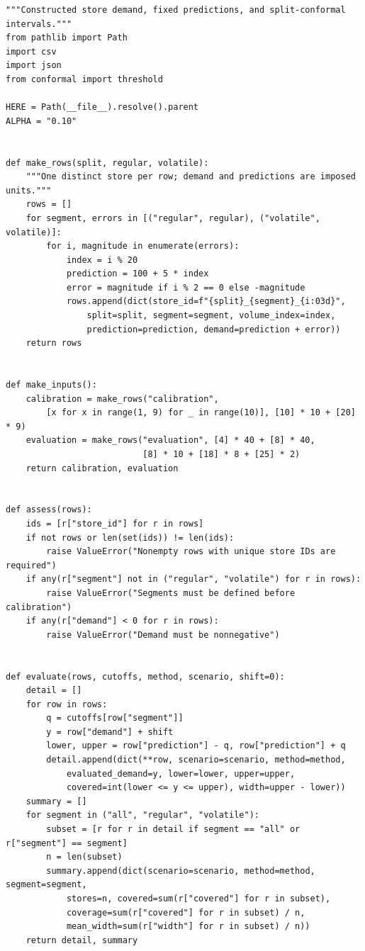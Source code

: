 \begin{Verbatim}[breaklines,breakanywhere,fontsize=\small]
"""Constructed store demand, fixed predictions, and split-conformal intervals."""
from pathlib import Path
import csv
import json
from conformal import threshold

HERE = Path(__file__).resolve().parent
ALPHA = "0.10"


def make_rows(split, regular, volatile):
    """One distinct store per row; demand and predictions are imposed units."""
    rows = []
    for segment, errors in [("regular", regular), ("volatile", volatile)]:
        for i, magnitude in enumerate(errors):
            index = i % 20
            prediction = 100 + 5 * index
            error = magnitude if i % 2 == 0 else -magnitude
            rows.append(dict(store_id=f"{split}_{segment}_{i:03d}",
                split=split, segment=segment, volume_index=index,
                prediction=prediction, demand=prediction + error))
    return rows


def make_inputs():
    calibration = make_rows("calibration",
        [x for x in range(1, 9) for _ in range(10)], [10] * 10 + [20] * 9)
    evaluation = make_rows("evaluation", [4] * 40 + [8] * 40,
                           [8] * 10 + [18] * 8 + [25] * 2)
    return calibration, evaluation


def assess(rows):
    ids = [r["store_id"] for r in rows]
    if not rows or len(set(ids)) != len(ids):
        raise ValueError("Nonempty rows with unique store IDs are required")
    if any(r["segment"] not in ("regular", "volatile") for r in rows):
        raise ValueError("Segments must be defined before calibration")
    if any(r["demand"] < 0 for r in rows):
        raise ValueError("Demand must be nonnegative")


def evaluate(rows, cutoffs, method, scenario, shift=0):
    detail = []
    for row in rows:
        q = cutoffs[row["segment"]]
        y = row["demand"] + shift
        lower, upper = row["prediction"] - q, row["prediction"] + q
        detail.append(dict(**row, scenario=scenario, method=method,
            evaluated_demand=y, lower=lower, upper=upper,
            covered=int(lower <= y <= upper), width=upper - lower))
    summary = []
    for segment in ("all", "regular", "volatile"):
        subset = [r for r in detail if segment == "all" or r["segment"] == segment]
        n = len(subset)
        summary.append(dict(scenario=scenario, method=method, segment=segment,
            stores=n, covered=sum(r["covered"] for r in subset),
            coverage=sum(r["covered"] for r in subset) / n,
            mean_width=sum(r["width"] for r in subset) / n))
    return detail, summary



\end{Verbatim}
